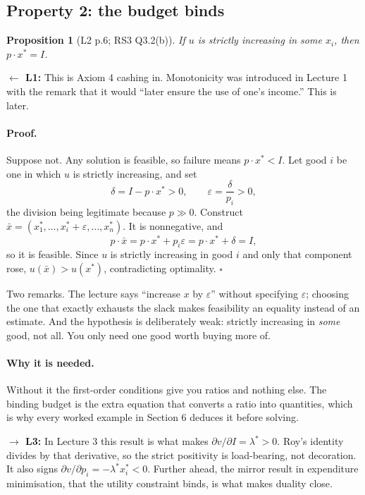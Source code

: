 \documentclass[11pt]{article}
\newtheorem{proposition}{Proposition}
\theoremstyle{definition}
\newenvironment{keybox}{\begin{snugshade}\noindent\ignorespaces}{\end{snugshade}}
\newcommand{\xs}{x^*}
\newcommand{\back}[1]{\textbf{\small $\leftarrow$ L1:} \small #1}
\newcommand{\fwd}[1]{\textbf{\small $\rightarrow$ L3:} \small #1}
\begin{document}
\subsection{Property 2: the budget binds}

\begin{proposition}[L2 p.6; RS3 Q3.2(b)]
If $u$ is strictly increasing in some $x_i$, then $p\cdot\xs=I$.
\end{proposition}

\back{This is Axiom 4 cashing in. Monotonicity was introduced in Lecture 1 with the remark
that it would ``later ensure the use of one's income.'' This is later.}

\paragraph{Proof.} Suppose not. Any solution is feasible, so failure means
$p\cdot\xs<I$. Let good $i$ be one in which $u$ is strictly increasing, and set
\[
\delta = I-p\cdot\xs>0,\qquad \varepsilon=\frac{\delta}{p_i}>0,
\]
the division being legitimate because $p\gg0$. Construct
$\bar x=(x_1^*,\dots,x_i^*+\varepsilon,\dots,x_n^*)$. It is nonnegative, and
\[
p\cdot\bar x = p\cdot\xs+p_i\varepsilon = p\cdot\xs+\delta = I,
\]
so it is feasible. Since $u$ is strictly increasing in good $i$ and only that component
rose, $u(\bar x)>u(\xs)$, contradicting optimality. \hfill$\square$

\vspace{3pt}
\noindent Two remarks. The lecture says ``increase $x$ by $\varepsilon$'' without
specifying $\varepsilon$; choosing the one that exactly exhausts the slack makes
feasibility an equality instead of an estimate. And the hypothesis is deliberately weak:
strictly increasing in \emph{some} good, not all. You only need one good worth buying more
of.

\paragraph{Why it is needed.} Without it the first-order conditions give you ratios and
nothing else. The binding budget is the extra equation that converts a ratio into
quantities, which is why every worked example in Section 6 deduces it before solving.

\begin{keybox}
\fwd{In Lecture 3 this result is what makes $\partial v/\partial I=\lambda^*>0$. Roy's
identity divides by that derivative, so the strict positivity is load-bearing, not
decoration. It also signs $\partial v/\partial p_i=-\lambda^*x_i^*<0$. Further ahead, the
mirror result in expenditure minimisation, that the utility constraint binds, is what makes
duality close.}
\end{keybox}
\end{document}
